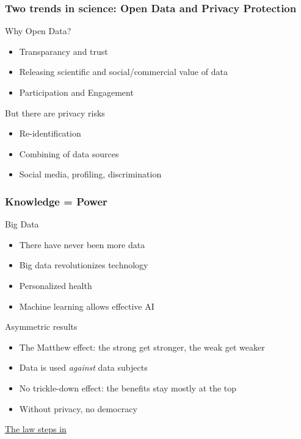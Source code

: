 \documentclass[xcolor=dvipsnames]{beamer}
\begin{document}
\begin{frame}
	\frametitle{Two trends in science: Open Data and Privacy Protection}
	
	\begin{block}{Why Open Data?}
	\begin{itemize}
	\item Transparancy and trust
	\item Releasing scientific and social/commercial value of data
	\item Participation and Engagement
	\end{itemize}
\end{block}

\begin{block}{But there are privacy risks}
	\begin{itemize}
	\item Re-identification  \hspace{2.5cm}{\em speaker identification, MRI ``picture''}
	\item Combining of data sources \hspace{2.5cm}{\em health data \& shopping list}
	\item Social media, profiling, discrimination  \hspace{1.5cm}{\em bullying, pricing, work}
	\end{itemize}
	\end{block}
	
\end{frame}
	
\begin{frame}[label=Knowledge]
	\frametitle{Knowledge = Power}
	\begin{block}{Big Data}
	\begin{itemize}
	\item There have never been more data
	\item Big data revolutionizes technology
	\item Personalized health
	\item Machine learning allows effective AI
	\end{itemize}
	\end{block}
	
	\begin{block}{Asymmetric results}
	\begin{itemize}
	\item The Matthew effect: the strong get stronger, the weak get weaker
	\item Data is used {\em against} data subjects
	\item No trickle-down effect: the benefits stay mostly at the top
	\item Without privacy, no democracy
	\end{itemize}
	\end{block}
	\hyperlink{Intervention of the law}{The law steps in}
\end{frame}
	
\end{document}
